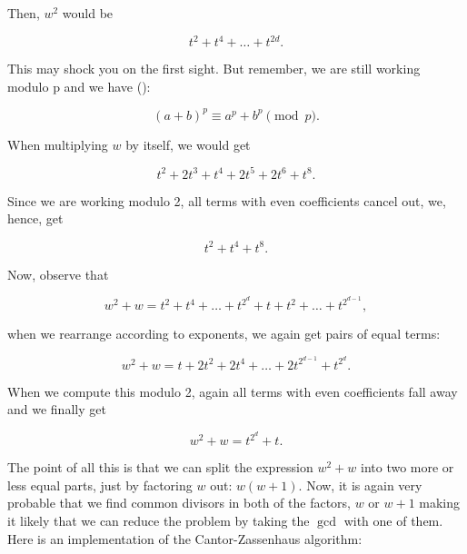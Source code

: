 \documentclass[tikz]{scrreprt}
\begin{document}
Then, $w^2$ would be 

\[
t^2 + t^4 + \dots + t^{2d}.
\]

This may shock you on the first sight.
But remember, we are still working modulo p 
and we have ():

\[
(a+b)^p \equiv a^p + b^p \pmod{p}.
\]

When multiplying $w$ by itself, we would get

\[
t^2 + 2t^3 + t^4 + 2t^5 + 2t^6 + t^8.
\]

Since we are working modulo 2,
all terms with even coefficients cancel out,
we, hence, get

\[
t^2 + t^4 + t^8.
\]

Now, observe that 

\[
w^2 + w = t^2 + t^4 + \dots + t^{2^d} + t + t^2 + \dots + t^{2^{d-1}},
\]

when we rearrange according to exponents, we again get pairs of equal terms:

\[
w^2 + w = t + 2t^2 + 2t^4 + \dots +  2t^{2^{d-1}} + t^{2^d}.
\]

When we compute this modulo 2, again all terms with even coefficients
fall away and we finally get

\begin{equation}
w^2 + w = t^{2^d} + t.
\end{equation}

The point of all this is that we can split the expression $w^2 + w$
into two more or less equal parts, just by factoring $w$ out:
$w(w+1)$. Now, it is again very probable that we find common divisors
in both of the factors, $w$ or $w+1$ making it likely that we can
reduce the problem by taking the $\gcd$ with one of them.
Here is an implementation of the Cantor-Zassenhaus algorithm:
\end{document}
